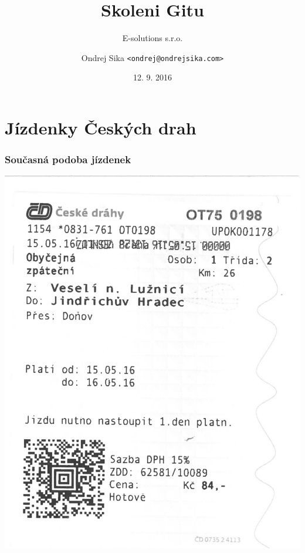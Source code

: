 \documentclass{beamer}
\title[Skoleni Gitu]{Skoleni Gitu}
\subtitle[E-solutions s.r.o.]{E-solutions s.r.o.}
\author[Ondrej Sika]{Ondrej Sika \texttt{<ondrej@ondrejsika.com>}}
\date[12. 9. 2016]{12. 9. 2016}
\begin{document}


\begin{frame}
  \titlepage
\end{frame}




\section{Jízdenky Českých drah}

\begin{frame}
	\frametitle{Současná podoba jízdenek}
	\begin{center}
		\includegraphics[scale=0.16]{./images/0033_0010.png}
	\end{center}
\end{frame}
\end{document}
